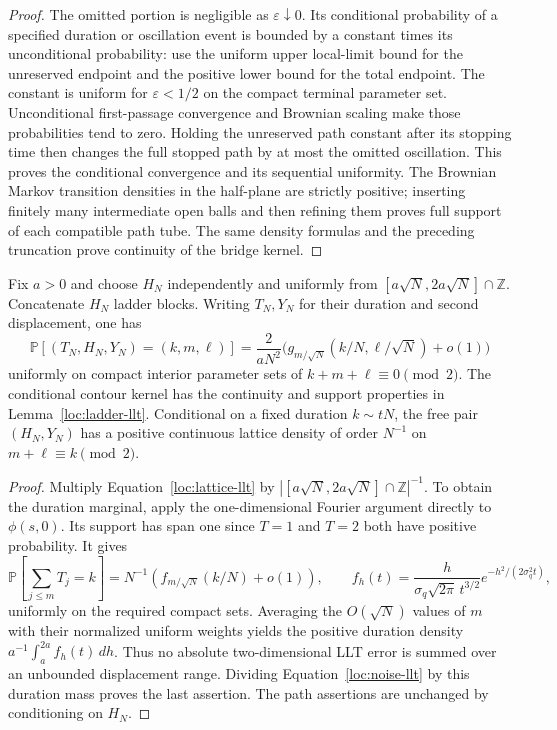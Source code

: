 \begin{proof}
The omitted portion is negligible as $\varepsilon\downarrow0$.
Its conditional probability of a specified duration or oscillation event
is bounded by a constant times its unconditional probability: use the
uniform upper local-limit bound for the unreserved endpoint and the
positive lower bound for the total endpoint.  The constant is uniform for
$\varepsilon<1/2$ on the compact terminal parameter set.  Unconditional
first-passage convergence and Brownian scaling make those probabilities
tend to zero.  Holding the unreserved path constant after its stopping
time then changes the full stopped path by at most the omitted
oscillation.  This proves the conditional convergence and its sequential
uniformity.  The Brownian Markov transition densities in the half-plane
are strictly positive; inserting finitely many intermediate open balls
and then refining them proves full support of each compatible path tube.
The same density formulas and the preceding truncation prove continuity
of the bridge kernel.
\end{proof}

\begin{corollary}\label{loc:noise-density}
Fix $a>0$ and choose $H_N$ independently and uniformly from
$[a\sqrt N,2a\sqrt N]\cap\mathbb Z$.  Concatenate $H_N$ ladder blocks.
Writing $T_N,Y_N$ for their duration and second displacement, one has
\begin{equation}\label{loc:noise-llt}
 \mathbb P[(T_N,H_N,Y_N)=(k,m,\ell)]
 =\frac{2}{aN^2}
 \bigl(g_{m/\sqrt N}(k/N,\ell/\sqrt N)+o(1)\bigr)
\end{equation}
uniformly on compact interior parameter sets of
$k+m+\ell\equiv0\pmod2$.  The conditional contour kernel has the
continuity and support properties in Lemma~\ref{loc:ladder-llt}.
Conditional on a fixed duration $k\sim tN$, the free pair $(H_N,Y_N)$
has a positive continuous lattice density of order $N^{-1}$ on
$m+\ell\equiv k\pmod2$.
\end{corollary}
\begin{proof}
Multiply Equation~\eqref{loc:lattice-llt} by
$|[a\sqrt N,2a\sqrt N]\cap\mathbb Z|^{-1}$.  To obtain the duration
marginal, apply the one-dimensional Fourier argument directly to
$\phi(s,0)$.  Its support has span one since $T=1$ and $T=2$ both
have positive probability.  It gives
\[
 \mathbb P\left[\sum_{j\le m}T_j=k\right]
 =N^{-1}\left(f_{m/\sqrt N}(k/N)+o(1)\right),\qquad
 f_h(t)=\frac{h}{\sigma_q\sqrt{2\pi}\,t^{3/2}}
          e^{-h^2/(2\sigma_q^2t)},
\]
uniformly on the required compact sets.  Averaging the $O(\sqrt N)$
values of $m$ with their normalized uniform weights yields the positive
duration density $a^{-1}\int_a^{2a}f_h(t)\,dh$.  Thus no absolute
two-dimensional LLT error is summed over an unbounded displacement
range.  Dividing Equation~\eqref{loc:noise-llt} by this duration mass
proves the last assertion.  The path assertions are unchanged by
conditioning on $H_N$.
\end{proof}


